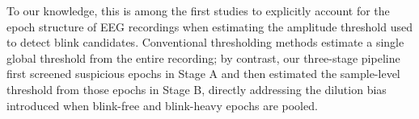 To our knowledge, this is among the first studies to explicitly account for the epoch structure of EEG recordings when estimating the amplitude threshold used to detect blink candidates. Conventional thresholding methods estimate a single global threshold from the entire recording; by contrast, our three-stage pipeline first screened suspicious epochs in Stage A and then estimated the sample-level threshold from those epochs in Stage B, directly addressing the dilution bias introduced when blink-free and blink-heavy epochs are pooled.
